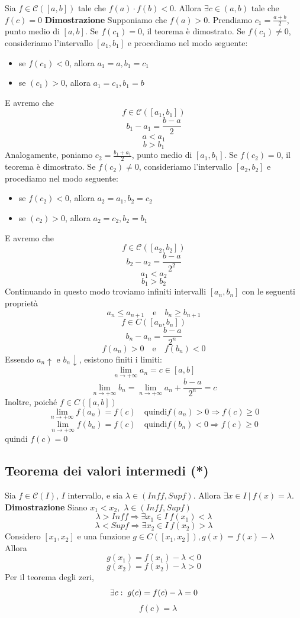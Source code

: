 \documentclass[12pt]{article}
\begin{document}
Sia $f \in \mathscr{C}([a,b])$ tale che $f(a)\cdot f(b)<0$. Allora $\exists c \in (a,b)$ tale che $f(c) = 0$ \newline
\textbf{Dimostrazione} \newline
Supponiamo che $f(a) > 0$. Prendiamo $c_1 = \frac{a+b}{2}$, punto medio di $[a,b]$. Se $f(c_1)=0$, il teorema è dimostrato. Se $f(c_1) \neq 0$, consideriamo l'intervallo $[a_1, b_1]$ e procediamo nel modo seguente:
\begin{itemize}
  \item se $f(c_1) < 0$, allora $a_1 = a, b_1 = c_1$
  \item se $(c_1) > 0$, allora $a_1 = c_1, b_1 = b$
\end{itemize}
E avremo che 
\[ f \in \mathscr{C}([a_1,b_1]) \]
\[b_1 - a_1 = \frac{b-a}{2}\]
\[a<a_1\] 
\[b>b_1\]
Analogamente, poniamo $c_2 = \frac{b_1 + a_1}{2}$, punto medio di $[a_1,b_1]$. Se $f(c_2)=0$, il teorema è dimostrato. Se $f(c_2) \neq 0$, consideriamo l'intervallo $[a_2, b_2]$ e procediamo nel modo seguente:
\begin{itemize}
  \item se $f(c_2) < 0$, allora $a_2 = a_1, b_2 = c_2$
  \item se $(c_2) > 0$, allora $a_2 = c_2, b_2 = b_1$
\end{itemize}
E avremo che
\[ f \in \mathscr{C}([a_2,b_2]) \]
\[b_2 - a_2 = \frac{b-a}{2^2}\]
\[a_1<a_2\] 
\[b_1>b_2\]
Continuando in questo modo troviamo infiniti intervalli $[a_n, b_n]$
con le seguenti proprietà
\[
a_n \leq a_{n+1} \quad \text{e} \quad b_n \geq b_{n+1}
\]
\[ f \in C([a_n,b_n]) \]
\[ b_n - a_n = \frac{b-a}{2^n} \] 
\[ f(a_n)>0 \quad \text{e} \quad f(b_n) < 0 \]
\newpage
Essendo ${a_n}\uparrow$ e ${b_n}\downarrow$, esistono finiti i limiti:
\[ \lim_{n \to +\infty} a_n = c \in [a,b] \]
\[ \lim_{n \to +\infty} b_n = \lim_{n \to +\infty} a_n + \frac{b-a}{2^n} = c \]
Inoltre, poiché $f \in C([a,b])$
\[ \lim_{n \to +\infty} f(a_n) = f(c)\quad \text{quindi} f(a_n) >0 \Rightarrow f(c) \geq 0 \]
\[ \lim_{n \to +\infty} f(b_n) = f(c) \quad \text{quindi} f(b_n) <0 \Rightarrow f(c) \geq 0 \]
quindi $f(c) = 0$

\subsection{Teorema dei valori intermedi (*)}
Sia $f \in \mathscr{C}(I)$, $I$ intervallo, e sia $\lambda \in (Inf f, Sup f)$.
Allora $\exists x \in I\ |\ f(x) = \lambda$.\newline
\textbf{Dimostrazione} \newline
Siano $x_1 < x_2$,\ $\lambda \in (Inf f, Sup f)$
\[ \lambda > Inf f \Rightarrow \exists x_1 \in I\ f(x_1) < \lambda \]
\[ \lambda < Sup f \Rightarrow \exists x_2 \in I\ f(x_2) > \lambda \]
Considero $[x_1,x_2]$ e una funzione $g \in C([x_1,x_2]), g(x) = f(x) - \lambda$\\
Allora 
\[g(x_1) = f(x_1) - \lambda < 0\] 
\[g(x_2) = f(x_2) - \lambda > 0\]
Per il teorema degli zeri,
\[\exists c: \hspace*{0.1cm} g(c) = f(c) - \lambda = 0 \]
\[\quad f(c) = \lambda \]
\end{document}
